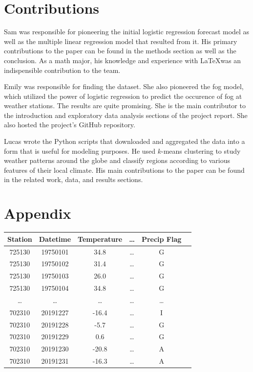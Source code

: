 \documentclass[conference]{IEEEtran}
\begin{document}
\section{Contributions}

Sam was responsible for pioneering the initial logistic regression forecast model as well as the multiple linear regression model that resulted from it. His primary contributions to the paper can be found in the methods section as well as the conclusion. As a math major, his knowledge and experience with \LaTeX was an indispensible contribution to the team.

Emily was responsible for finding the dataset. She also pioneered the fog model, which utilized the power of logistic regression to predict the occurence of fog at weather stations. The results are quite promising. She is the main contributor to the introduction and exploratory data analysis sections of the project report. She also hosted the project's GitHub repository.

Lucas wrote the Python scripts that downloaded and aggregated the data into a form that is useful for modeling purposes. He used $k$-means clustering to study weather patterns around the globe and classify regions according to various features of their local climate. His main contributions to the paper can be found in the related work, data, and results sections.

\section{Appendix}

\begin{table}[h!]
\centering
 \begin{tabular}{||c c c c c c||}
 \hline
  Station& Datetime &Temperature & \dots & Precip Flag \\ [0.5ex]
 \hline\hline
 725130 & 19750101 & 34.8 & \dots & G \\
 725130 & 19750102 & 31.4 & \dots & G \\
 725130 & 19750103 & 26.0 & \dots & G \\
 725130 & 19750104 & 34.8 & \dots & G \\
 \dots & \dots & \dots & \dots & \dots \\
 702310 & 20191227 & -16.4 & \dots & I \\
 702310 & 20191228 & -5.7 & \dots & G \\
 702310 & 20191229 & 0.6 & \dots & G \\
 702310 & 20191230 & -20.8 & \dots & A \\
 702310 & 20191231 & -16.3 & \dots & A \\[1ex]

 \hline
 \end{tabular}
\end{table}
\end{document}
